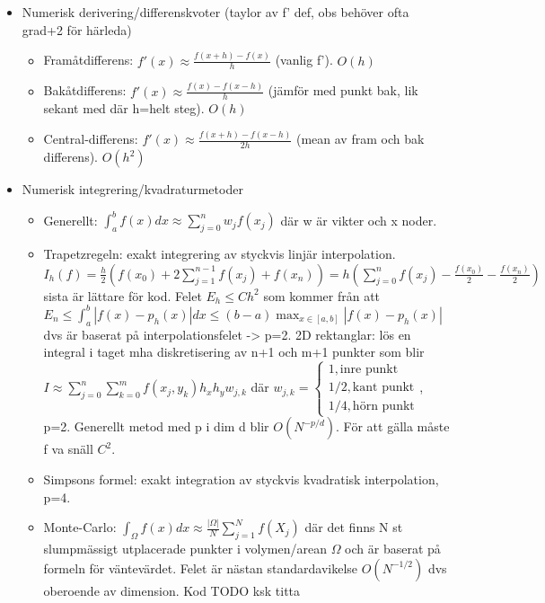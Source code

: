 \documentclass[a4paper]{article}
\begin{document}
\begin{itemize}
    \item Numerisk derivering/differenskvoter (taylor av f' def, obs behöver ofta grad+2 för härleda)
    \begin{itemize}
        \item Framåtdifferens: $f'(x)\approx \frac{f(x+h)-f(x)}{h}$ (vanlig f'). $O(h)$ 
        \item Bakåtdifferens: $f'(x)\approx \frac{f(x)-f(x-h)}{h}$ (jämför med punkt bak, lik sekant med där h=helt steg). $O(h)$
        \item Central-differens: $f'(x)\approx \frac{f(x+h)-f(x-h)}{2h}$ (mean av fram och bak differens). $O(h^2)$
    \end{itemize}
    \item Numerisk integrering/kvadraturmetoder
    \begin{itemize}
        \item Generellt: $\int_{a}^{b}f(x)dx\approx \sum_{j=0}^{n}w_jf(x_j)$ där w är vikter och x noder.
        \item Trapetzregeln: exakt integrering av styckvis linjär interpolation. $I_h(f)=\frac{h}{2}(f(x_0)+2\sum_{j=1}^{n-1}f(x_j)+f(x_n))=h(\sum_{j=0}^{n}f(x_j)-\frac{f(x_0)}{2}-\frac{f(x_n)}{2})$ sista är lättare för kod. Felet $E_h\leq Ch^2$ som kommer från att $E_n\leq \int_a^b |f(x)-p_h(x)|dx\leq (b-a) \max_{x\in [a, b]} |f(x)-p_h(x)|$ dvs är baserat på interpolationsfelet -> p=2. 2D rektanglar: lös en integral i taget mha diskretisering av n+1 och m+1 punkter som blir $I\approx \sum_{j=0}^{n}\sum_{k=0}^{m} f(x_j, y_k)h_x h_y w_{j, k}$ där $w_{j, k}=\begin{cases}1, \text{inre punkt} \\ 1/2, \text{kant punkt}\\1/4, \text{hörn punkt} \end{cases}$, p=2. Generellt metod med p i dim d blir $O(N^{-p/d})$. För att gälla måste f va snäll $C^2$. 
        \item Simpsons formel: exakt integration av styckvis kvadratisk interpolation, p=4.
        \item Monte-Carlo: $\int_\Omega f(x)dx\approx\frac{| \Omega |}{N}\sum_{j=1}^{N}f(X_j)$ där det finns N st slumpmässigt utplacerade punkter i volymen/arean $\Omega$ och är baserat på formeln för väntevärdet. Felet är nästan standardavikelse $O(N^{-1/2})$ dvs oberoende av dimension. Kod TODO ksk titta

\end{itemize}
\end{itemize}
\end{document}
